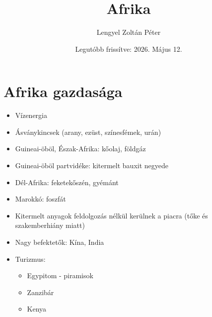 \documentclass{article}
\title{Afrika}
\author{Lengyel Zoltán Péter}
\date{Legutóbb frissítve: 2026. Május 12.}
\begin{document}
\maketitle
\tableofcontents
\newpage

\section{Afrika gazdasága}
\begin{itemize}
    \item Vízenergia
    \item Ásványkincsek (arany, ezüst, színesfémek, urán)
    \item Guineai-öböl, Észak-Afrika: kőolaj, földgáz
    \item Guineai-öböl partvidéke: kitermelt bauxit negyede
    \item Dél-Afrika: feketekőszén, gyémánt
    \item Marokkó: foszfát
    \item Kitermelt anyagok feldolgozás nélkül kerülnek a piacra (tőke és szakemberhiány miatt) 
    \item Nagy befektetők: Kína, India
    \item Turizmus: \begin{itemize}
        \item Egypitom - piramisok
        \item Zanzibár
        \item Kenya
    \end{itemize}
\end{itemize}
\end{document}
